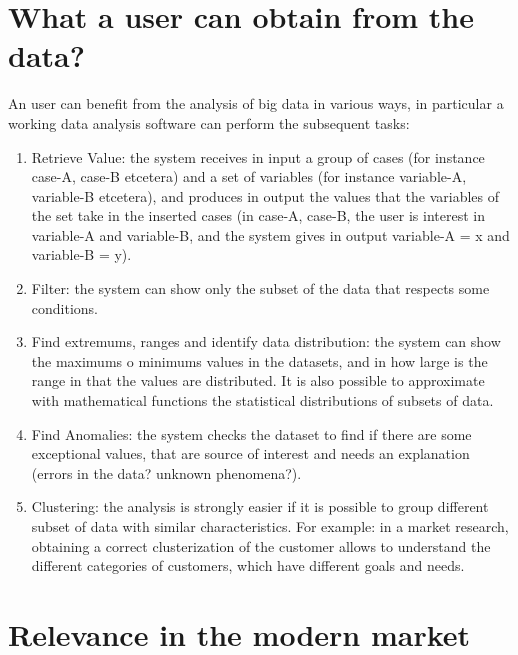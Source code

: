 \section{What a user can obtain from the data?}

An user can benefit from the analysis of big data in various ways, in particular a working data analysis software can perform the subsequent tasks:

\begin{enumerate}

\item Retrieve Value: the system receives in input a group of cases (for instance case-A, case-B etcetera) and a set of variables (for instance variable-A, variable-B etcetera), and produces in output the values that the variables of the set take in the inserted cases (in case-A, case-B, the user is interest in variable-A and variable-B, and the system gives in output variable-A = x and variable-B = y).

\item Filter: the system can show only the subset of the data that respects some conditions.

\item Find extremums, ranges and identify data distribution: the system can show the maximums o minimums values in the datasets, and in how large is the range in that the values are distributed. It is also possible to approximate with mathematical functions the statistical distributions of subsets of data. 

\item Find Anomalies: the system checks the dataset to find if there are some exceptional values, that are source of interest and needs an explanation (errors in the data? unknown phenomena?).

\item Clustering: the analysis is strongly easier if it is possible to group different subset of data with similar characteristics. For example: in a market research, obtaining a correct clusterization of the customer allows to understand the different categories of customers, which have different goals and needs.      

\end{enumerate}

\section{Relevance in the modern market}

